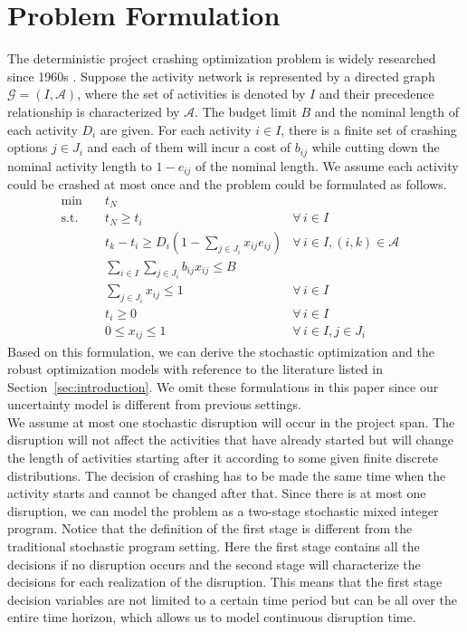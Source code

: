 \documentclass[11pt]{article}
\begin{document}
\section{Problem Formulation} \label{sec:formulation}
	The deterministic project crashing optimization problem is widely researched since 1960s \cite{fulkerson1961network, kelley1961criticalpath}. Suppose the activity network is represented by a directed graph \(\mathcal{G} = (I,\mathcal{A})\), where the set of activities is denoted by \(I\) and their precedence relationship is characterized by \(\mathcal{A}\). The budget limit \(B\) and the nominal length of each activity \(D_i\) are given. For each activity \(i \in I\), there is a finite set of crashing options \(j \in J_i\) and each of them will incur a cost of \(b_{ij}\) while cutting down the nominal activity length to \(1 - e_{ij}\) of the nominal length.  We assume each activity could be crashed at most once and the problem could be formulated as follows. 
	\begin{subequations} \label{prob2:static}
		\begin{align}
		\min \quad & t_N &\\
		\text{s.t.} \quad & t_N \geq t_i & \forall \,i \in I \\
		& t_k - t_i \geq D_{i}(1 - \sum_{j \in J_i} x_{ij} e_{ij}) & \forall \,i \in I, (i,k) \in \mathcal{A}\\
		& \sum_{i \in I} \sum_{j \in J_i} b_{ij}x_{ij} \leq B & \\
		& \sum_{j \in J_i} x_{ij} \leq 1 & \forall \,i \in I\\
		& t_i \geq 0 & \forall \,i \in I\\
		& 0 \leq x_{ij} \leq 1 & \forall \,i \in I, j \in J_i&
		\end{align}
	\end{subequations}
	Based on this formulation, we can derive the stochastic optimization and the robust optimization models with reference to the literature listed in Section~\ref{sec:introduction}. We omit these formulations in this paper since our uncertainty model is different from previous settings.\\
	\newline
	We assume at most one stochastic disruption will occur in the project span. The disruption will not affect the activities that have already started but will change the length of activities starting after it according to some given finite discrete distributions. The decision of crashing has to be made the same time when the activity starts and cannot be changed after that. Since there is at most one disruption, we can model the problem as a two-stage stochastic mixed integer program. Notice that the definition of the first stage is different from the traditional stochastic program setting. Here the first stage contains all the decisions if no disruption occurs and the second stage will characterize the decisions for each realization of the disruption. This means that the first stage decision variables are not limited to a certain time period but can be all over the entire time horizon, which allows us to model continuous disruption time.\\
\end{document}
